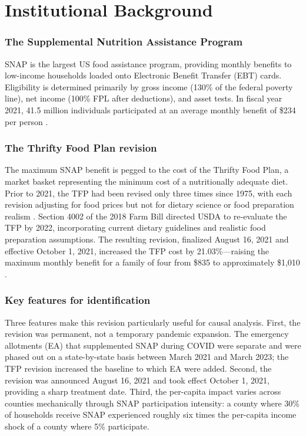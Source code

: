 \documentclass[12pt]{article}
\begin{document}
\section{Institutional Background}

\subsubsection*{The Supplemental Nutrition Assistance Program} SNAP is the largest US food assistance program, providing monthly benefits to low-income households loaded onto Electronic Benefit Transfer (EBT) cards. Eligibility is determined primarily by gross income (130\% of the federal poverty line), net income (100\% FPL after deductions), and asset tests. In fiscal year 2021, 41.5 million individuals participated at an average monthly benefit of \$234 per person \citep{fns2022}.

\subsubsection*{The Thrifty Food Plan revision} The maximum SNAP benefit is pegged to the cost of the Thrifty Food Plan, a market basket representing the minimum cost of a nutritionally adequate diet. Prior to 2021, the TFP had been revised only three times since 1975, with each revision adjusting for food prices but not for dietary science or food preparation realism \citep{usda2021}. Section 4002 of the 2018 Farm Bill directed USDA to re-evaluate the TFP by 2022, incorporating current dietary guidelines and realistic food preparation assumptions. The resulting revision, finalized August 16, 2021 and effective October 1, 2021, increased the TFP cost by 21.03\%---raising the maximum monthly benefit for a family of four from \$835 to approximately \$1,010 \citep{usda2021}.

\subsubsection*{Key features for identification} Three features make this revision particularly useful for causal analysis. First, the revision was permanent, not a temporary pandemic expansion. The emergency allotments (EA) that supplemented SNAP during COVID were separate and were phased out on a state-by-state basis between March 2021 and March 2023; the TFP revision increased the baseline to which EA were added. Second, the revision was announced August 16, 2021 and took effect October 1, 2021, providing a sharp treatment date. Third, the per-capita impact varies across counties mechanically through SNAP participation intensity: a county where 30\% of households receive SNAP experienced roughly six times the per-capita income shock of a county where 5\% participate.
\end{document}
